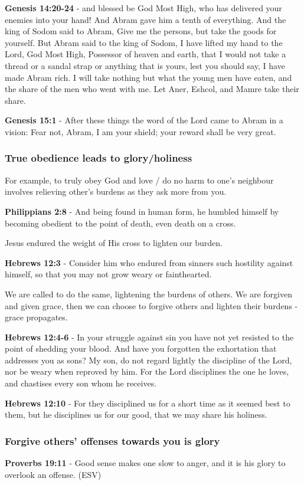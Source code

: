 \documentclass[11pt]{article}
\begin{document}
\textbf{Genesis 14:20-24} - and blessed be God Most High, who has delivered your enemies into your hand! And Abram gave him a tenth of everything. And the king of Sodom said to Abram, Give me the persons, but take the goods for yourself. But Abram said to the king of Sodom, I have lifted my hand to the Lord, God Most High, Possessor of heaven and earth, that I would not take a thread or a sandal strap or anything that is yours, lest you should say, I have made Abram rich. I will take nothing but what the young men have eaten, and the share of the men who went with me. Let Aner, Eshcol, and Mamre take their share.

\textbf{Genesis 15:1} - After these things the word of the Lord came to Abram in a vision: Fear not, Abram, I am your shield; your reward shall be very great.

\subsubsection{True obedience leads to glory/holiness}
\label{sec:orga8463f6}
For example, to truly obey God and love / do no harm to one's neighbour involves relieving other's burdens as they ask more from you.

\textbf{Philippians 2:8} - And being found in human form, he humbled himself by becoming obedient to the point of death, even death on a cross.

Jesus endured the weight of His cross to lighten our burden.

\textbf{Hebrews 12:3} - Consider him who endured from sinners such hostility against himself, so that you may not grow weary or fainthearted.

We are called to do the same, lightening the burdens of others.
We are forgiven and given grace, then we can choose to forgive others and lighten their burdens - grace propagates.

\textbf{Hebrews 12:4-6} - In your struggle against sin you have not yet resisted to the point of shedding your blood.  And have you forgotten the exhortation that addresses you as sons? My son, do not regard lightly the discipline of the Lord, nor be weary when reproved by him.  For the Lord disciplines the one he loves, and chastises every son whom he receives.

\textbf{Hebrews 12:10} - For they disciplined us for a short time as it seemed best to them, but he disciplines us for our good, that we may share his holiness.

\subsubsection{Forgive others' offenses towards you is glory}
\label{sec:org9432b2f}
\textbf{Proverbs 19:11} - Good sense makes one slow to anger, and it is his glory to overlook an offense. (ESV)
\end{document}
